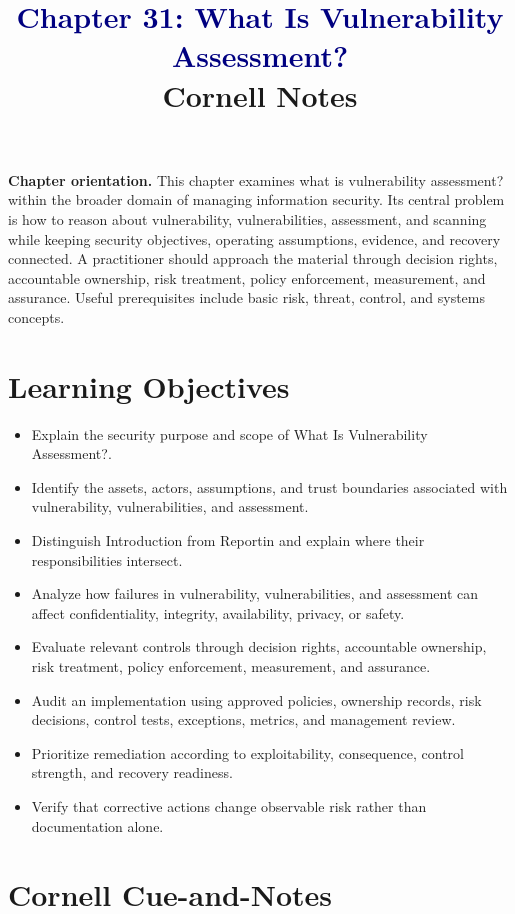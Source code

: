 \documentclass[11pt]{article}
\title{\textcolor{Navy}{Chapter 31: What Is Vulnerability Assessment?}\\[2mm]\large Cornell Notes}
\author{}
\date{}
\begin{document}
\maketitle
\thispagestyle{fancy}
\vspace{-1.5em}
\begin{orientationbox}
\textbf{Chapter orientation.} This chapter examines what is vulnerability assessment? within the broader domain of managing information security. Its central problem is how to reason about vulnerability, vulnerabilities, assessment, and scanning while keeping security objectives, operating assumptions, evidence, and recovery connected. A practitioner should approach the material through decision rights, accountable ownership, risk treatment, policy enforcement, measurement, and assurance. Useful prerequisites include basic risk, threat, control, and systems concepts.
\end{orientationbox}
\section*{Learning Objectives}
\begin{itemize}
\item Explain the security purpose and scope of What Is Vulnerability Assessment?.
\item Identify the assets, actors, assumptions, and trust boundaries associated with vulnerability, vulnerabilities, and assessment.
\item Distinguish Introduction from Reportin and explain where their responsibilities intersect.
\item Analyze how failures in vulnerability, vulnerabilities, and assessment can affect confidentiality, integrity, availability, privacy, or safety.
\item Evaluate relevant controls through decision rights, accountable ownership, risk treatment, policy enforcement, measurement, and assurance.
\item Audit an implementation using approved policies, ownership records, risk decisions, control tests, exceptions, metrics, and management review.
\item Prioritize remediation according to exploitability, consequence, control strength, and recovery readiness.
\item Verify that corrective actions change observable risk rather than documentation alone.
\end{itemize}
\section*{Cornell Cue-and-Notes}
\end{document}
